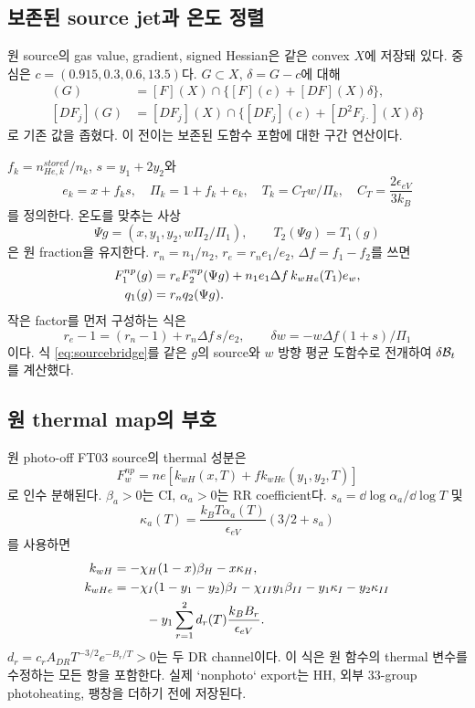 \subsection{보존된 source jet과 온도 정렬}
원 source의 gas value, gradient, signed Hessian은 같은 convex $X$에 저장돼 있다. 중심은 $c=(0.915,0.3,0.6,13.5)$다. $G\subset X$, $\delta=G-c$에 대해
\begin{align}
[F](G)&=[F](X)\cap\{[F](c)+[DF](X)\delta\},\\
[DF_j](G)&=[DF_j](X)\cap\{[DF_j](c)+[D^2F_{j\cdot}](X)\delta\}
\label{eq:taylorjet}
\end{align}
로 기존 값을 좁혔다. 이 전이는 보존된 도함수 포함에 대한 구간 연산이다.

$f_k=n_{He,k}^{stored}/n_k$, $s=y_1+2y_2$와
\begin{equation}
e_k=x+f_ks,\quad \Pi_k=1+f_k+e_k,\quad T_k=C_Tw/\Pi_k,
\quad C_T=\frac{2\epsilon_{eV}}{3k_B}
\label{eq:thermo}
\end{equation}
를 정의한다. 온도를 맞추는 사상
\begin{equation}
\Psi g=(x,y_1,y_2,w\Pi_2/\Pi_1),\qquad T_2(\Psi g)=T_1(g)
\label{eq:pullback}
\end{equation}
은 원 fraction을 유지한다. $r_n=n_1/n_2$, $r_e=r_ne_1/e_2$, $\Delta f=f_1-f_2$를 쓰면
\begin{align}
F_1^{np}(g)&=r_eF_2^{np}(\Psi g)
+n_1e_1\Delta f\,k_{wHe}(T_1)e_w,\\
q_1(g)&=r_nq_2(\Psi g).
\label{eq:sourcebridge}
\end{align}
작은 factor를 먼저 구성하는 식은
\begin{equation}
r_e-1=(r_n-1)+r_n\Delta f\,s/e_2,
\qquad \delta w=-w\Delta f(1+s)/\Pi_1
\label{eq:smallfactors}
\end{equation}
이다. 식 \eqref{eq:sourcebridge}를 같은 $g$의 source와 $w$ 방향 평균 도함수로 전개하여 $\delta\mathcal B_t$를 계산했다.

\subsection{원 thermal map의 부호}
원 photo-off FT03 source의 thermal 성분은
\begin{equation}
F_w^{np}=ne[k_{wH}(x,T)+f k_{wHe}(y_1,y_2,T)]
\label{eq:cooldecomp}
\end{equation}
로 인수 분해된다. $\beta_a>0$는 CI, $\alpha_a>0$는 RR coefficient다. $s_a=\dd\log\alpha_a/\dd\log T$ 및
\begin{equation}
\kappa_a(T)=\frac{k_BT\alpha_a(T)}{\epsilon_{eV}}(3/2+s_a)
\end{equation}
를 사용하면
\begin{align}
k_{wH}&=-\chi_H(1-x)\beta_H-x\kappa_H,\\
k_{wHe}&=-\chi_I(1-y_1-y_2)\beta_I-\chi_{II}y_1\beta_{II}
-y_1\kappa_I-y_2\kappa_{II}\notag\\
&\hspace{9mm}-y_1\sum_{r=1}^2d_r(T)\frac{k_B B_r}{\epsilon_{eV}}.
\label{eq:kw}
\end{align}
$d_r=c_rA_{DR}T^{-3/2}e^{-B_r/T}>0$는 두 DR channel이다. 이 식은 원 함수의 thermal 변수를 수정하는 모든 항을 포함한다. 실제 `nonphoto` export는 HH, 외부 33-group photoheating, 팽창을 더하기 전에 저장된다.\cite{sourceaudit}

